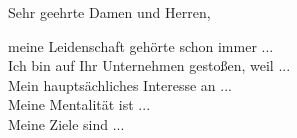 Sehr geehrte Damen und Herren, 

meine Leidenschaft gehörte schon immer ...\\

Ich bin auf Ihr Unternehmen gestoßen, weil ... \\

Mein hauptsächliches Interesse an ... \\

Meine Mentalität ist ... \\

Meine Ziele sind ...\\


